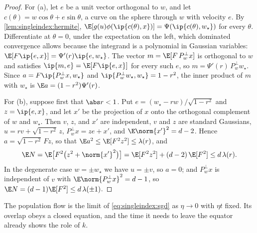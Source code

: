 \begin{refsection}
\begin{proof}
For (a), let $e$ be a unit vector orthogonal to $w$, and let $c(\theta)=w\cos\theta+e\sin\theta$, a curve on the sphere through $w$ with velocity $e$. By \cref{lem:singleindex:hermite}, $\E[g(u)\phi(\ip{c(\theta),x})]=\Psi(\ip{c(\theta),w_\star})$ for every $\theta$. Differentiate at $\theta=0$, under the expectation on the left, which dominated convergence allows because the integrand is a polynomial in Gaussian variables: $\E[F\ip{e,x}]=\Psi'(r)\ip{e,w_\star}$. The vector $m=\E[F\,P_w^\perp x]$ is orthogonal to $w$ and satisfies $\ip{m,e}=\E[F\ip{e,x}]$ for every such $e$, so $m=\Psi'(r)\,P_w^\perp w_\star$. Since $a=F\ip{P_w^\perp x,w_\star}$ and $\ip{P_w^\perp w_\star,w_\star}=1-r^2$, the inner product of $m$ with $w_\star$ is $\E a=(1-r^2)\Psi'(r)$.

For (b), suppose first that $\abs r<1$. Put $e=(w_\star-rw)/\sqrt{1-r^2}$ and $z=\ip{e,x}$, and let $x'$ be the projection of $x$ onto the orthogonal complement of $w$ and $w_\star$. Then $v$, $z$, and $x'$ are independent, $v$ and $z$ are standard Gaussians, $u=rv+\sqrt{1-r^2}\,z$, $P_w^\perp x=ze+x'$, and $\E\norm{x'}^2=d-2$. Hence $a=\sqrt{1-r^2}\,Fz$, so that $\E a^2\le\E[F^2z^2]\le\lambda(r)$, and
\[
  \E N=\E\bigl[F^2\bigl(z^2+\norm{x'}^2\bigr)\bigr]=\E[F^2z^2]+(d-2)\,\E[F^2]\le d\,\lambda(r).
\]
In the degenerate case $w=\pm w_\star$ we have $u=\pm v$, so $a=0$; and $P_w^\perp x$ is independent of $v$ with $\E\norm{P_w^\perp x}^2=d-1$, so $\E N=(d-1)\E[F^2]\le d\,\lambda(\pm1)$.
\end{proof}


The population flow is the limit of \eqref{eq:singleindex:sgd} as $\eta\to0$ with $\eta t$ fixed. Its overlap obeys a closed equation, and the time it needs to leave the equator already shows the role of $k$.


\end{refsection}
